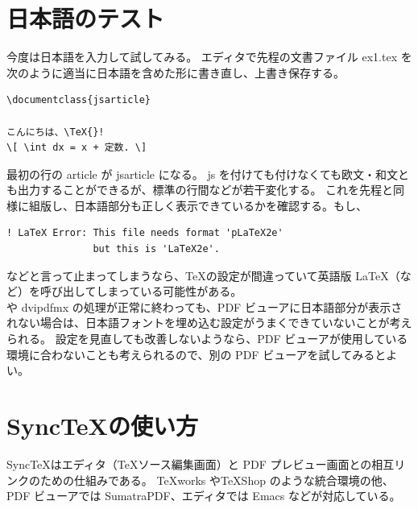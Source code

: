 \section{日本語のテスト}
今度は日本語を入力して試してみる。
エディタで先程の文書ファイル ex1.tex を次のように適当に日本語を含めた形に書き直し、上書き保存する。
\begin{mdframed}[roundcorner=0.50zw,leftmargin=3.00zw,rightmargin=3.00zw,skipabove=0.40zw,skipbelow=0.40zw,innertopmargin=4.00pt,innerbottommargin=4.00pt,innerleftmargin=5.00pt,innerrightmargin=5.00pt,linecolor=gray!020,linewidth=0.50pt,backgroundcolor=gray!20]
\begin{verbatim}
\documentclass{jsarticle}

こんにちは、\TeX{}!
\[ \int dx = x + 定数. \]

\end{verbatim}
\end{mdframed}
最初の行の article が jsarticle になる。
js を付けても付けなくても欧文・和文とも出力することができるが、標準の行間などが若干変化する。\enlargethispage{+0.30zw}
これを先程と同様に組版し、日本語部分も正しく表示できているかを確認する。もし、
\begin{mdframed}[roundcorner=0.50zw,leftmargin=3.00zw,rightmargin=3.00zw,skipabove=0.40zw,skipbelow=0.40zw,innertopmargin=4.00pt,innerbottommargin=4.00pt,innerleftmargin=5.00pt,innerrightmargin=5.00pt,linecolor=gray!090,linewidth=0.50pt,backgroundcolor=gray!90]\color{gray!10}
\begin{verbatim}
! LaTeX Error: This file needs format 'pLaTeX2e'
               but this is 'LaTeX2e'.
\end{verbatim}
\end{mdframed}
などと言って止まってしまうなら、\TeX{}の設定が間違っていて英語版 \LaTeX（\pdfLaTeX{}など）を呼び出してしまっている可能性がある。\\

\pLaTeX{}や dvipdfmx の処理が正常に終わっても、PDF ビューアに日本語部分が表示されない場合は、日本語フォントを埋め込む設定がうまくできていないことが考えられる。
設定を見直しても改善しないようなら、PDF ビューアが使用している環境に合わないことも考えられるので、別の PDF ビューアを試してみるとよい。
\section{Sync\TeX{}の使い方}
Sync\TeX{}はエディタ（\TeX{}ソース編集画面）と PDF プレビュー画面との相互リンクのための仕組みである。
\TeX{}works や\TeX{}Shop のような統合環境の他、PDF ビューアでは SumatraPDF、エディタでは Emacs などが対応している。\\

